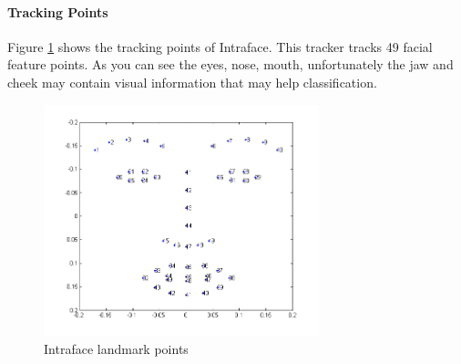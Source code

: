 \paragraph{Tracking Points}
Figure \ref{fig:IPI} shows the tracking points of Intraface. This tracker tracks 49 facial feature points. As you can see the eyes, nose, mouth, unfortunately the jaw and cheek may contain visual information that may help classification.
\begin{figure}[ht]
\centering
\includegraphics[width = 80mm]{imgs/FacialIndexIntraface.png}
\caption{Intraface landmark points}
\label{fig:IPI}
\end{figure}
